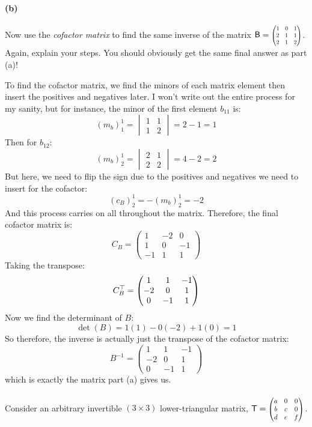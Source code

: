 \documentclass{article}
\begin{document}
\paragraph{(b)}
Now use the \emph{cofactor matrix} to find the same inverse of the matrix $\mathsf{B} = \smmatrix{0.7}{1 & 0 & 1\\2 & 1 & 1 \\ 2 & 1 & 2}$.  
Again, explain your steps. You should obviously get the same final answer as part (a)!

\begin{solution}
	To find the cofactor matrix, we find the minors of each matrix element then insert the positives and 
	negatives later. I won't write out the entire process for my sanity, but for instance, the minor
	of the first element $b_{11}$ is:
	\[
		(m_b)^1_1 = \begin{vmatrix} 1 & 1\\1&2\end{vmatrix} = 2 - 1 = 1
	\] 
	Then for $b_{12}$:
	\[
		(m_b)^1_2 = \begin{vmatrix} 2&1\\2&2\end{vmatrix} = 4 - 2 = 2
	\] 
	But here, we need to flip the sign due to the positives and negatives we need to insert for the cofactor:
	\[
		(c_B)^1_2 = -(m_b)^1_2 = -2
	\] 
	And this process carries on all throughout the matrix. Therefore, the final cofactor matrix is:
	\[
		C_B = \begin{pmatrix} 1&-2&0\\1&0&-1\\-1&1&1 \end{pmatrix} 
	\] 
	Taking the transpose:
	\[
		C_B^\top = \begin{pmatrix} 1&1&-1\\-2&0&1\\0&-1&1 \end{pmatrix} 
	\] 
	Now we find the determinant of $B$:
	\[
	\det(B) = 1(1) - 0(-2) + 1(0) = 1
	\] 
	So therefore, the inverse is actually just the transpose of the cofactor matrix:
	\[
		B^{-1} = \begin{pmatrix} 1&1&-1\\-2&0&1\\0&-1&1 \end{pmatrix} 
	\] 
	which is exactly the matrix part (a) gives us. 
\end{solution}
\phline
\paragraph{}
Consider an arbitrary invertible $(3\times 3)$ lower-triangular matrix, $\mathsf{T} = \smmatrix{0.8}{a & 0 & 0\\b&c&0\\d&e&f}$.
\end{document}
